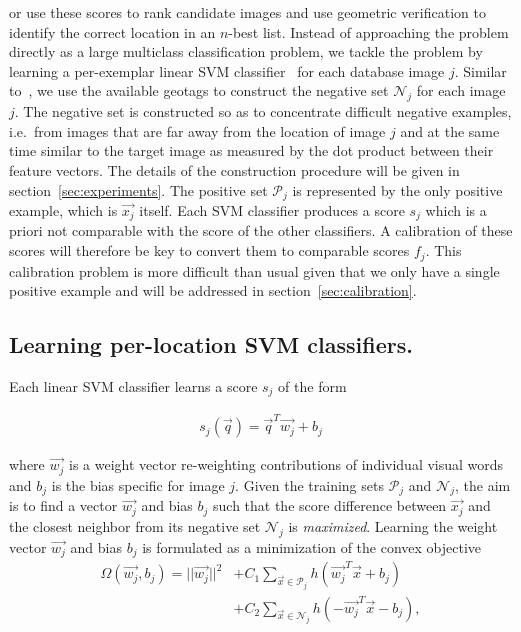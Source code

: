    \noindent
   or use these scores to rank candidate images and use geometric verification to identify the correct location in an $n$-best list.
   Instead of approaching the problem directly as a large multiclass classification problem, we tackle the problem by learning a per-exemplar linear SVM classifier~\cite{Malisiewicz11}  for each database image $j$.
   Similar to~\cite{Knopp2010}, we use the available geotags to construct the negative set $\mathcal N_j$ for each image $j$. The negative set is constructed so as to concentrate difficult negative examples, i.e.\ from images that are far away from the location of image $j$ and at the same time similar to the target image as measured by the dot product between their feature vectors. The details of the construction procedure will be given in section~\ref{sec:experiments}.  The positive set $\mathcal P_j$ is represented by the only positive example, which is $\vec{x_j}$ itself. 
   Each SVM classifier produces a score $s_j$ which is a priori not comparable with the score of the other classifiers. A calibration of these scores will therefore be key to convert them to comparable scores $f_j$. This calibration problem is more difficult than usual given that we only have a single positive example and will be addressed in section~\ref{sec:calibration}.
   
   \subsection{Learning per-location SVM classifiers. }
      Each linear SVM classifier learns a score $s_j$ of the form 

      \begin{align}
        s_j(\vec{q})=\vec{q}^T \vec{w_j}+b_j
        \label{eq:linear}
      \end{align}

      \noindent
      where $\vec{w_j}$ is a weight vector re-weighting contributions of individual visual words and $b_j$ is the bias specific for image $j$. Given the training sets $\mathcal P_j$ and $\mathcal N_j$, the aim is to find a vector $\vec{w_j}$ and bias $b_j$ such that the score difference between $\vec{x_j}$ and the closest neighbor from its negative set $\mathcal N_j$ is {\em maximized}. %
      Learning the weight vector $\vec{w_j}$ and bias $b_j$ is formulated as a minimization of the convex objective 
      \begin{align}
        \nonumber
        \Omega(\vec{w_j},b_j)=||\vec{w_j}||^{2}& +C_1\sum_{\vec{x}\in \mathcal P_j}h(\vec{w_j}^T\vec{x}+b_j)   \\
        \label{eq:obj}
                           & +C_2\sum_{\vec{x}\in \mathcal N_j}h(-\vec{w_j}^T\vec{x}-b_j), 
      \end{align}

